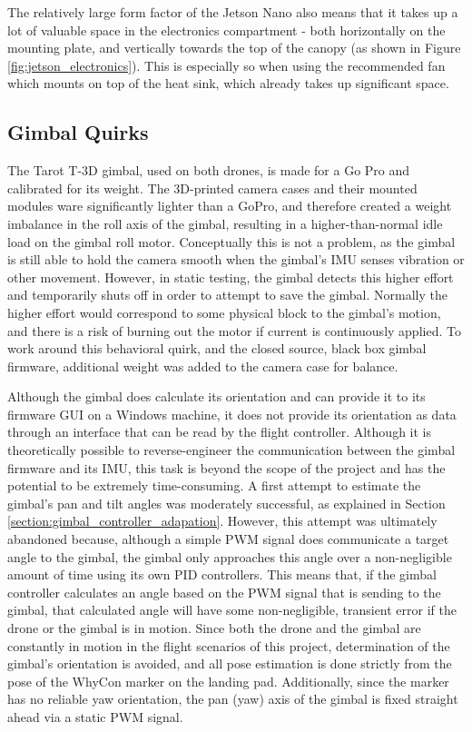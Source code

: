 The relatively large form factor of the Jetson Nano also means that it takes up a lot of valuable space in the electronics compartment - both horizontally on the mounting plate, and vertically towards the top of the canopy (as shown in Figure \ref{fig:jetson_electronics}). This is especially so when using the recommended fan which mounts on top of the heat sink, which already takes up significant space.

\subsection{Gimbal Quirks}

The Tarot T-3D gimbal, used on both drones, is made for a Go Pro and calibrated for its weight. The 3D-printed camera cases and their mounted modules ware significantly lighter than a GoPro, and therefore created a weight imbalance in the roll axis of the gimbal, resulting in a higher-than-normal idle load on the gimbal roll motor. Conceptually this is not a problem, as the gimbal is still able to hold the camera smooth when the gimbal's IMU senses vibration or other movement. However, in static testing, the gimbal detects this higher effort and temporarily shuts off in order to attempt to save the gimbal. Normally the higher effort would correspond to some physical block to the gimbal's motion, and there is a risk of burning out the motor if current is continuously applied. To work around this behavioral quirk, and the closed source, black box gimbal firmware, additional weight was added to the camera case for balance.

Although the gimbal does calculate its orientation and can provide it to its firmware GUI on a Windows machine, it does not provide its orientation as data through an interface that can be read by the flight controller. Although it is theoretically possible to reverse-engineer the communication between the gimbal firmware and its IMU, this task is beyond the scope of the project and has the potential to be extremely time-consuming. A first attempt to estimate the gimbal's pan and tilt angles was moderately successful, as explained in Section \ref{section:gimbal_controller_adapation}. However, this attempt was ultimately abandoned because, although a simple PWM signal does communicate a target angle to the gimbal, the gimbal only approaches this angle over a non-negligible amount of time using its own PID controllers. This means that, if the gimbal controller calculates an angle based on the PWM signal that is sending to the gimbal, that calculated angle will have some non-negligible, transient error if the drone or the gimbal is in motion. Since both the drone and the gimbal are constantly in motion in the flight scenarios of this project, determination of the gimbal's orientation is avoided, and all pose estimation is done strictly from the pose of the WhyCon marker on the landing pad. Additionally, since the marker has no reliable yaw orientation, the pan (yaw) axis of the gimbal is fixed straight ahead via a static PWM signal.

